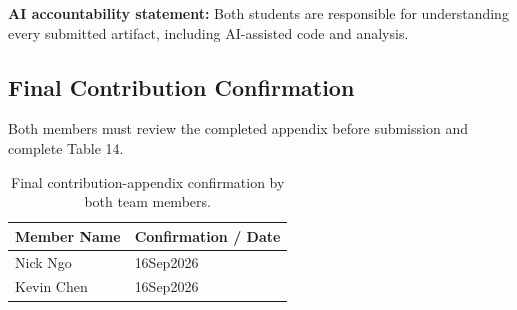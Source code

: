 \documentclass{article}
\begin{document}
\noindent
\textbf{AI accountability statement:} Both students are responsible for understanding every submitted artifact, including AI-assisted code and analysis.


\subsection{Final Contribution Confirmation}

Both members must review the completed appendix before submission and complete Table 14.


\begin{table}[H]
\centering
\caption{Final contribution-appendix confirmation by both team members.}
\label{tab:final-confirmation}

\begin{tabular}{|p{6cm}|p{8cm}|}
\hline
\textbf{Member Name} &
\textbf{Confirmation / Date} \\
\hline

Nick Ngo & 16Sep2026\\
\hline

Kevin Chen & 16Sep2026\\
\hline

\end{tabular}

\end{table}
\end{document}
